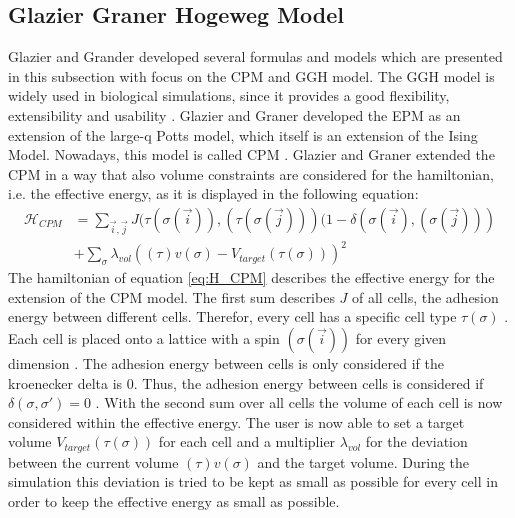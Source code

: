\subsection{Glazier Graner Hogeweg Model} \label{subsec:Intro_GGH}
Glazier and Grander developed several formulas and models which are presented in this subsection with focus on the \ac{CPM} and \ac{GGH} model.\newline
The \ac{GGH} model is widely used in biological simulations, since it provides a good flexibility, extensibility and usability \cite{Glazier2007}. 
Glazier and Graner \cite{Glazier2007} developed the \ac{EPM} as an extension of the large-q Potts model, which itself is an extension of the Ising Model. Nowadays, this model is called \ac{CPM} \cite{Glazier2007, Graner1992, Glazier1993}. Glazier and Graner extended the \ac{CPM} in a way that also volume constraints are considered for the hamiltonian, i.e. the effective energy, as it is displayed in the following equation:
\begin{equation}\label{eq:H_CPM}
\begin{split}
\mathcal{H}_{CPM} & = \sum_{\vec{i},\vec{j}}^{ }J(\tau(\sigma(\vec{i})),(\tau(\sigma(\vec{j})))(1-\delta(\sigma(\vec{i}),(\sigma(\vec{j}))) \\
		 & + \sum_{\sigma}^{}{\lambda_{vol}((\tau)v(\sigma)-V_{target}(\tau(\sigma)))^2}
\end{split}
\end{equation}
The hamiltonian of equation \ref{eq:H_CPM} describes the effective energy for the extension of the \ac{CPM} model. The first sum describes $J$ of all cells, the adhesion energy between different cells. Therefor, every cell has a specific cell type $\tau(\sigma)$ \cite{Glazier1993, Graner1992}. Each cell is placed onto a lattice with a spin $(\sigma(\vec{i}))$ for every given dimension \cite{Graner1992, Glazier2007}. The adhesion energy between cells is only considered if the kroenecker delta is 0. Thus, the adhesion energy between cells is considered if $\delta(\sigma, \sigma') = 0$ \cite{Glazier1993, Graner1992, Stott1999, Glazier2007, Chen2007, Cickovski2005}. \newline
With the second sum over all cells the volume of each cell is now considered within the effective energy. The user is now able to set a target volume $V_{target}(\tau(\sigma))$ for each cell and a multiplier $\lambda_{vol}$ for the deviation between the current volume $(\tau)v(\sigma)$ and the target volume. During the simulation this deviation is tried to be kept as small as possible for every cell in order to keep the effective energy as small as possible.

